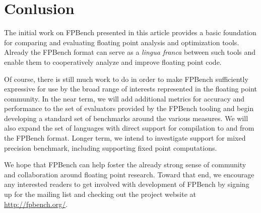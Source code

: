 \documentclass[main.tex]{subfiles}
\begin{document}
\section{Conlusion}
\label{sec:conlusion}

The initial work on FPBench presented in this article provides a basic
foundation for comparing and evaluating floating point analysis and
optimization tools.  Already the FPBench format can serve as a
\textit{lingua franca} between such tools and enable them to
cooperatively analyze and improve floating point code.

Of course, there is still much work to do in order to make FPBench
sufficiently expressive for use by the broad range of interests represented
in the floating point community.  In the near term, we will add additional
metrics for accuracy and performance to the set of evaluators provided by
the FPBench tooling and begin developing a standard set of benchmarks
around the various measures.  We will also expand the set of languages with
direct support for compilation to and from the FPBench format.  Longer
term, we intend to investigate support for mixed precision benchmark,
including supporting fixed point computations.

We hope that FPBench can help foster the already strong sense of community
and collaboration around floating point research.  Toward that end, we
encourage any interested readers to get involved with development of
FPBench by signing up for the mailing list and checking out the project
website at \url{http://fpbench.org/}.
\end{document}
